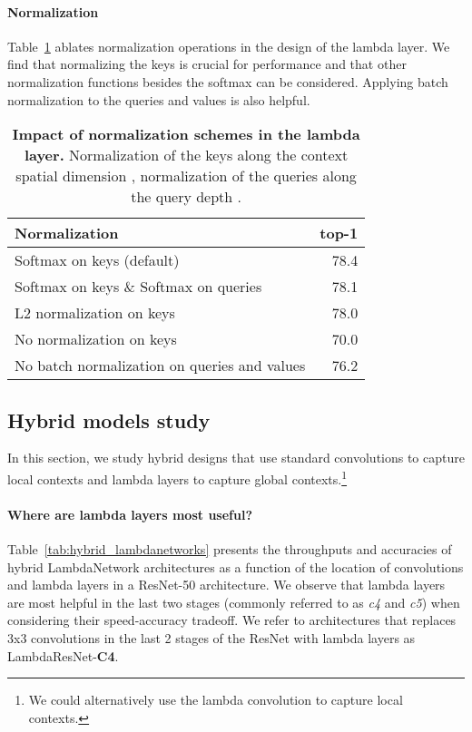\documentclass{article} \usepackage{iclr2021_conference,times}
\begin{document}
\vspace{-0.1cm}
\paragraph{Normalization\label{sec:normalization}}
Table~\ref{tab:normalization} ablates normalization operations in the design of the lambda layer.
We find that normalizing the keys is crucial for performance and that other normalization functions besides the softmax can be considered.
Applying batch normalization to the queries and values is also helpful.

\begin{table}[h]
  \begin{center}
  \small
  \begin{tabular}{lr}
    \toprule
    Normalization & top-1 \\
    \midrule
    Softmax on keys (default) & 78.4 \\
    Softmax on keys \& Softmax on queries & 78.1 \\
    L2 normalization on keys & 78.0 \\
    No normalization on keys & 70.0 \\
    \midrule
    No batch normalization on queries and values & 76.2 \\
    \bottomrule
  \end{tabular}
  \caption{
  \textbf{Impact of normalization schemes in the lambda layer.}
  Normalization of the keys along the context spatial dimension , normalization of the queries along the query depth .
  }
  \label{tab:normalization}
  \end{center}
\end{table}

\subsection{Hybrid models study}
In this section, we study hybrid designs that use standard convolutions to capture local contexts and lambda layers to capture global contexts.\footnote{We could alternatively use the lambda convolution to capture local contexts.}

\vspace{-0.1cm}
\paragraph{Where are lambda layers most useful?}
Table~\ref{tab:hybrid_lambdanetworks} presents the throughputs and accuracies of hybrid LambdaNetwork architectures as a function of the location of convolutions and lambda layers in a ResNet-50 architecture.
We observe that lambda layers are most helpful in the last two stages (commonly referred to as \emph{c4} and \emph{c5}) when considering their speed-accuracy tradeoff.
We refer to architectures that replaces 3x3 convolutions in the last 2 stages of the ResNet with lambda layers as LambdaResNet-\textbf{C4}.
\end{document}
